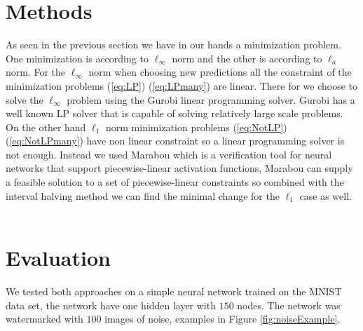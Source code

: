 \documentclass[a4paper]{easychair}
\newcommand{\guy}[1]{\marginpar{\textcolor{orange}{Guy: #1}}}
\begin{document}
\guy{Overall, this looks good. Some stuff will need to be moved to other
sections according to the paper layout.}

\section{Methods}
\label{sec:methods}

As seen in the previous section we have in our hands a minimization problem. One minimization is according to $\ell_\infty$ norm and the other is according to $\ell_a$ norm.
For the $\ell_\infty$ norm when choosing new predictions all the constraint of the minimization problems (\ref{eq:LP}) (\ref{eq:LPmany}) are linear. There for we choose to solve the $\ell_\infty$ problem using the Gurobi linear programming solver. Gurobi has a well known LP solver that is capable of solving relatively large scale problems.
On the other hand $\ell_1$ norm minimization problems (\ref{eq:NotLP}) (\ref{eq:NotLPmany}) have non linear constraint so a linear programming solver is not enough. Instead we used Marabou which is a verification tool for neural networks that support piecewise-linear activation functions, Marabou can supply a feasible solution to a set of piecewise-linear constraints so combined with the interval halving method we can find the minimal change for the $\ell_1$ case as well. 
\\\\

\section{Evaluation}
\label{sec:evaluation}

We tested both approaches on a simple neural network trained on the MNIST data set, the network have one hidden layer with $150$ nodes. The network was watermarked with $100$ images of noise, examples in Figure \ref{fig:noiseExample}.
\end{document}
